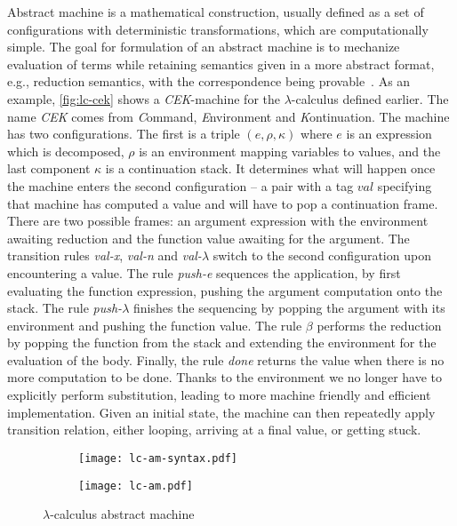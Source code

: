 \documentclass[inz, english, longabstract]{iithesis}
\newcommand{\LC}{\(\lambda\)-calculus}
\begin{document}
Abstract machine is a mathematical construction, usually defined as a set of configurations with deterministic transformations, which are computationally simple.
The goal for formulation of an abstract machine is to mechanize evaluation of terms while retaining semantics given in a more abstract format, e.g., reduction semantics, with the correspondence being provable~\cite{Felleisen2009}.
As an example, \autoref{fig:lc-cek} shows a \emph{CEK}-machine for the \LC{} defined earlier.
The name \emph{CEK} comes from \emph{C}ommand, \emph{E}nvironment and \emph{K}ontinuation.
The machine has two configurations.
The first is a triple $ (e, \rho, \kappa) $ where $ e $ is an expression which is decomposed, $ \rho $ is an environment mapping variables to values, and the last component $ \kappa $ is a continuation stack.
It determines what will happen once the machine enters the second configuration -- a pair with a tag $val$ specifying that machine has computed a value and will have to pop a continuation frame.
There are two possible frames: an argument expression with the environment awaiting reduction and the function value awaiting for the argument.
The transition rules \textit{val-x}, \textit{val-n} and \textit{val-$\lambda$} switch to the second configuration upon encountering a value.
The rule \textit{push-e} sequences the application, by first evaluating the function expression, pushing the argument computation onto the stack.
The rule \textit{push-$\lambda$} finishes the sequencing by popping the argument with its environment and pushing the function value.
The rule \textit{$\beta$} performs the reduction by popping the function from the stack and extending the environment for the evaluation of the body.
Finally, the rule \textit{done} returns the value when there is no more computation to be done.
Thanks to the environment we no longer have to explicitly perform substitution, leading to more machine friendly and efficient implementation.
Given an initial state, the machine can then repeatedly apply transition relation, either looping, arriving at a final value, or getting stuck. 
\begin{figure}
  \centering
  \begin{subfigure}{0.3\textwidth}
    \texttt{[image: lc-am-syntax.pdf]}
  \end{subfigure}
  \begin{subfigure}{0.69\textwidth}
    \texttt{[image: lc-am.pdf]}
  \end{subfigure}
  \caption{\LC{} abstract machine}
  \label{fig:lc-cek}
\end{figure}
\end{document}
